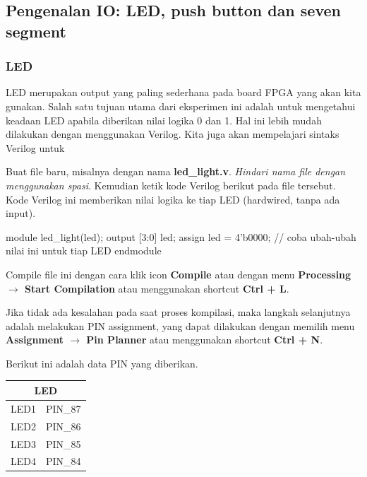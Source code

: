 \subsection{Pengenalan IO: LED, push button dan seven segment}

\subsubsection{LED}

LED merupakan output yang paling sederhana pada board FPGA yang akan
kita gunakan. Salah satu tujuan utama dari eksperimen ini adalah
untuk mengetahui keadaan LED apabila diberikan nilai logika 0 dan 1.
Hal ini lebih mudah dilakukan dengan menggunakan Verilog.
Kita juga akan mempelajari sintaks Verilog untuk


Buat file baru, misalnya dengan nama \textbf{led\_light.v}.
\textit{Hindari nama file dengan menggunakan spasi}.
Kemudian ketik kode Verilog berikut pada file tersebut.
Kode Verilog ini memberikan nilai logika ke tiap
LED (hardwired, tanpa ada input).

{
\begin{verilogcode}
module led_light(led);
  output [3:0] led;
  assign led = 4'b0000; // coba ubah-ubah nilai ini untuk tiap LED
endmodule
\end{verilogcode}
}

Compile file ini dengan cara klik icon \textbf{Compile} atau dengan menu
\textbf{Processing $\rightarrow$ Start Compilation} atau menggunakan shortcut
\textbf{Ctrl + L}.

Jika tidak ada kesalahan pada saat proses kompilasi,
maka langkah selanjutnya adalah melakukan
PIN assignment, yang dapat dilakukan dengan memilih menu
\textbf{Assignment $\rightarrow$ Pin Planner} atau menggunakan shortcut
\textbf{Ctrl + N}.

Berikut ini adalah data PIN yang diberikan.

\begin{table}[H]
\centering
\begin{tabular}{|c|c|}
\hline 
\multicolumn{2}{|c|}{LED} \\
\hline 
LED1 & PIN\_87 \\
\hline 
LED2 & PIN\_86 \\
\hline 
LED3 & PIN\_85 \\
\hline 
LED4 & PIN\_84 \\
\hline 
\end{tabular}
\par
\end{table}

